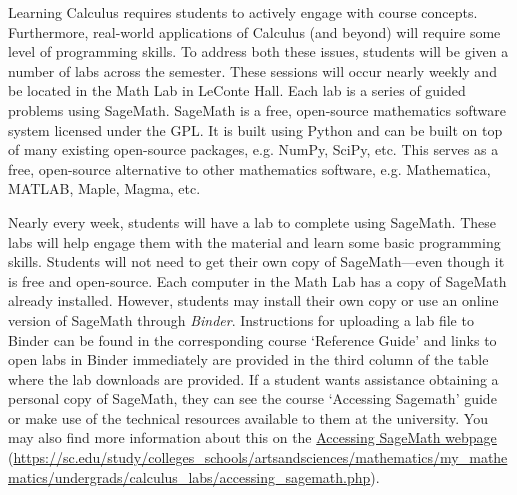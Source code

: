 \documentclass[11pt,letterpaper]{article}
\begin{document}
Learning Calculus requires students to actively engage with course concepts. Furthermore, real-world applications of Calculus (and beyond) will require some level of programming skills. To address both these issues, students will be given a number of labs across the semester. These sessions will occur nearly weekly and be located in the Math Lab in LeConte Hall. Each lab is a series of guided problems using SageMath. SageMath is a free, open-source mathematics software system licensed under the GPL. It is built using Python and can be built on top of many existing open-source packages, e.g. NumPy, SciPy, etc. This serves as a free, open-source alternative to other mathematics software, e.g. Mathematica, MATLAB, Maple, Magma, etc. \pspace

Nearly every week, students will have a lab to complete using SageMath. These labs will help engage them with the material and learn some basic programming skills. Students will not need to get their own copy of SageMath---even though it is free and open-source. Each computer in the Math Lab has a copy of SageMath already installed. However, students may install their own copy or use an online version of SageMath through \textit{Binder}. Instructions for uploading a lab file to Binder can be found in the corresponding course `Reference Guide' and links to open labs in Binder immediately are provided in the third column of the table where the lab downloads are provided. If a student wants assistance obtaining a personal copy of SageMath, they can see the course `Accessing Sagemath' guide or make use of the technical resources available to them at the university. You may also find more information about this on the \href{https://sc.edu/study/colleges\_schools/artsandsciences/mathematics/my\_mathematics/undergrads/calculus\_labs/accessing\_sagemath.php}{Accessing SageMath webpage} (\url{https://sc.edu/study/colleges\_schools/artsandsciences/mathematics/my\_mathematics/undergrads/calculus\_labs/accessing\_sagemath.php}). \pspace
\end{document}
